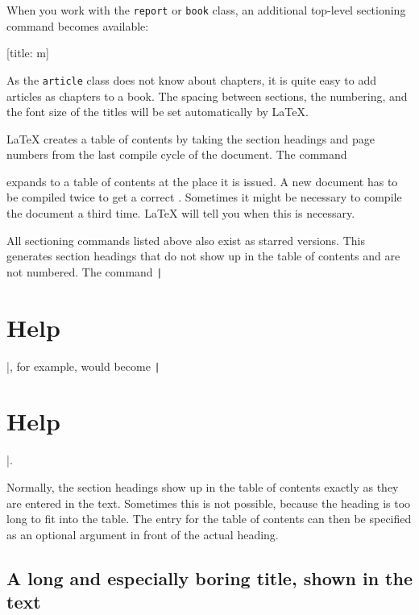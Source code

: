 When you work with the \texttt{report} or \texttt{book} class,
an additional top-level sectioning command becomes available:
\begin{lscommand}
  [title: m]
\end{lscommand}

As the \texttt{article} class does not know about chapters, it is quite easy
to add articles as chapters to a book.
The spacing between sections, the numbering, and the font size of the
titles will be set automatically by \LaTeX.

\LaTeX{} creates a table of contents by taking the section headings
and page numbers from the last compile cycle of the document. The command
\begin{lscommand}
\end{lscommand}
\noindent expands to a table of contents at the place it is issued. A new
document has to be compiled twice to get a correct .
Sometimes it might be necessary to compile the document a third time. \LaTeX{}
will tell you when this is necessary.

All sectioning commands listed above also exist as starred versions. This
generates section headings that do not show up in the table of contents and are
not numbered. The command \texttt|\section{Help}|, for example,
would become \texttt|\section*{Help}|.

Normally, the section headings show up in the table of contents exactly
as they are entered in the text. Sometimes this is not possible,
because the heading is too long to fit into the table. The
entry for the table of contents can then be specified as an
optional argument in front of the actual heading.

\begin{example}[standalone, paperwidth=6cm,paperheight=5cm]
\tableofcontents

\section[Title for the
  table of contents]{A long
  and especially boring title,
  shown in the text}
\end{example}

